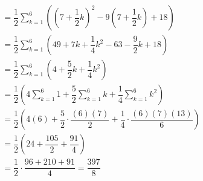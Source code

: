 \documentclass{ximera}
\begin{document}
\begin{problem}
\begin{enumerate}
\begin{explanation}
\begin{align*}
		&= \dfrac{1}{2} \displaystyle \sum_{k=1}^{6} \left( \left( 7 + \dfrac{1}{2} k \right)^2 - 9 \left( 7 + \dfrac{1}{2} k \right) + 18 \right) \\
		&= \dfrac{1}{2} \displaystyle \sum_{k=1}^{6} \left( 49 + 7k + \dfrac{1}{4} k^2 - 63 - \dfrac{9}{2} k + 18 \right) \\
		&= \dfrac{1}{2} \displaystyle \sum_{k=1}^{6} \left( 4 + \dfrac{5}{2} k+ \dfrac{1}{4} k^2 \right) \\
		&= \dfrac{1}{2} \left( 4 \displaystyle \sum_{k=1}^{6} 1 + \dfrac{5}{2} \displaystyle \sum_{k=1}^{6} k+ \dfrac{1}{4} \displaystyle \sum_{k=1}^{6} k^2 \right) \\
		&= \dfrac{1}{2} \left( 4(6) + \dfrac{5}{2} \cdot \dfrac{(6)(7)}{2} + \dfrac{1}{4} \cdot \dfrac{(6)(7)(13)}{6} \right) \\
		&= \dfrac{1}{2} \left( 24 + \dfrac{105}{2} + \dfrac{91}{4} \right) \\
		&= \dfrac{1}{2} \cdot \dfrac{96 + 210 + 91}{4} = \dfrac{397}{8}
		\end{align*}
		\end{explanation}
	
		
		
		
	\end{enumerate}
		
		
		

\end{problem}
\end{document}
